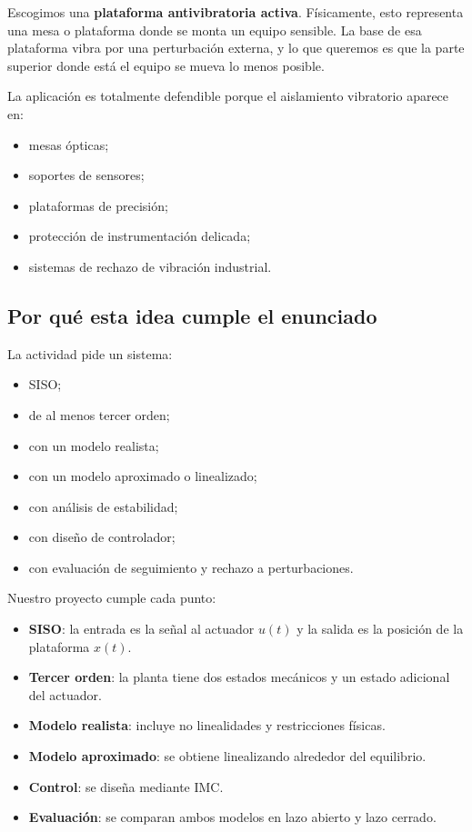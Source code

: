 \documentclass[11pt]{article}
\begin{document}
Escogimos una \textbf{plataforma antivibratoria activa}. F\'isicamente, esto representa una mesa o plataforma donde se monta un equipo sensible. La base de esa plataforma vibra por una perturbaci\'on externa, y lo que queremos es que la parte superior donde est\'a el equipo se mueva lo menos posible.

La aplicaci\'on es totalmente defendible porque el aislamiento vibratorio aparece en:

\begin{itemize}[leftmargin=1.2cm]
\item mesas \'opticas;
\item soportes de sensores;
\item plataformas de precisi\'on;
\item protecci\'on de instrumentaci\'on delicada;
\item sistemas de rechazo de vibraci\'on industrial.
\end{itemize}

\subsection{Por qu\'e esta idea cumple el enunciado}

La actividad pide un sistema:

\begin{itemize}[leftmargin=1.2cm]
\item SISO;
\item de al menos tercer orden;
\item con un modelo realista;
\item con un modelo aproximado o linealizado;
\item con an\'alisis de estabilidad;
\item con dise\~no de controlador;
\item con evaluaci\'on de seguimiento y rechazo a perturbaciones.
\end{itemize}

Nuestro proyecto cumple cada punto:

\begin{itemize}[leftmargin=1.2cm]
\item \textbf{SISO}: la entrada es la se\~nal al actuador $u(t)$ y la salida es la posici\'on de la plataforma $x(t)$.
\item \textbf{Tercer orden}: la planta tiene dos estados mec\'anicos y un estado adicional del actuador.
\item \textbf{Modelo realista}: incluye no linealidades y restricciones f\'isicas.
\item \textbf{Modelo aproximado}: se obtiene linealizando alrededor del equilibrio.
\item \textbf{Control}: se dise\~na mediante IMC.
\item \textbf{Evaluaci\'on}: se comparan ambos modelos en lazo abierto y lazo cerrado.
\end{itemize}
\end{document}
